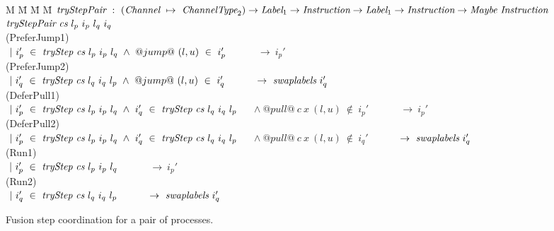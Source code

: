 
\newcommand\nextStep[5]{\big((#1,~#2),~(#3,~#4),~#5 \big)}


\newcommand\note[1]{\textcolor{notec}{(#1)}}

\begin{figure}
\begin{tabbing}
M \= M \= M \= M \kill
$\textit{tryStepPair} ~:~ (\textit{Channel} ~\mapsto~ \textit{ChannelType}_2) \to \textit{Label}_1 \to \textit{Instruction} \to \textit{Label}_1 \to \textit{Instruction} \to \textit{Maybe}~\textit{Instruction}$ \\
$\textit{tryStepPair} ~\textit{cs}~l_p~i_p~l_q~i_q$ \\

\> \note{PreferJump1} \\
\> $~|~i_p'~\in~\textit{tryStep}~\textit{cs}~l_p~i_p~l_q ~\wedge~@jump@~(l,u)~\in~i_p'$ 
   ~~~~~ $\to~i_p'$ \\
\> \note{PreferJump2} \\
\> $~|~i_q'~\in~\textit{tryStep}~\textit{cs}~l_q~i_q~l_p ~\wedge~@jump@~(l,u)~\in~i_q'$
   ~~~~~ $\to~\textit{swaplabels}~i_q'$ 
\\[0.5em]

\> \note{DeferPull1} \\
\> $~|~i_p'~\in~\textit{tryStep}~\textit{cs}~l_p~i_p~l_q ~\wedge~ i_q'~\in~\textit{tryStep}~\textit{cs}~l_q~i_q~l_p$ 
   ~~ $\wedge~@pull@~c~x~(l,u)~\not\in~i_p'$ 
   ~~~~~ $\to~i_p'$ \\
\> \note{DeferPull2} \\
\> $~|~i_p'~\in~\textit{tryStep}~\textit{cs}~l_p~i_p~l_q ~\wedge~i_q'~\in~\textit{tryStep}~\textit{cs}~l_q~i_q~l_p$
   ~~ $\wedge~@pull@~c~x~(l,u)~\not\in~i_q'$ 
   ~~~~~ $\to~\textit{swaplabels}~i_q'$ 
\\[0.5em]

\> \note{Run1} \\
\> $~|~i_p'~\in~\textit{tryStep}~\textit{cs}~l_p~i_p~l_q$ ~~~~~ $\to~i_p'$ \\
\> \note{Run2} \\
\> $~|~i_q'~\in~\textit{tryStep}~\textit{cs}~l_q~i_q~l_p$ ~~~~~ $\to~\textit{swaplabels}~i_q'$
\end{tabbing}
\caption{Fusion step coordination for a pair of processes.}
\label{fig:Fusion:Def:StepPair}
\end{figure}

